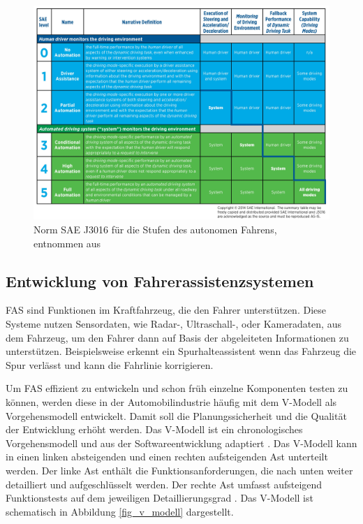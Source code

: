 \begin{figure}[h]
\centering
\includegraphics[scale=0.7]{images/level_autonomes_fahren.jpg}
\caption[Norm SAE J3016 für die Stufen des autonomen Fahrens]{Norm SAE J3016 für die Stufen des autonomen Fahrens, entnommen aus \cite{sae2014taxonomy}}
\label{fig_level_autonomes_fahren}
\end{figure}


\subsection{Entwicklung von Fahrerassistenzsystemen}
\label{grundlagen_fahren_entwicklung}

\ac{FAS} sind Funktionen im Kraftfahrzeug, die den Fahrer unterstützen. Diese Systeme nutzen Sensordaten, wie Radar-, Ultraschall-, oder Kameradaten, aus dem Fahrzeug, um den Fahrer dann auf Basis der abgeleiteten Informationen zu unterstützen. Beispielsweise erkennt ein Spurhalteassistent wenn das Fahrzeug die Spur verlässt und kann die Fahrlinie korrigieren. 

Um \ac{FAS} effizient zu entwickeln und schon früh einzelne Komponenten testen zu können, werden diese in der Automobilindustrie häufig mit dem V-Modell als Vorgehensmodell entwickelt. Damit soll die Planungssicherheit und die Qualität der Entwicklung erhöht werden. Das V-Modell ist ein chronologisches Vorgehensmodell und aus der Softwareentwicklung adaptiert \cite{vmodell2005}. Das V-Modell kann in einen linken absteigenden und einen rechten aufsteigenden Ast unterteilt werden. Der linke Ast enthält die Funktionsanforderungen, die nach unten weiter detailliert und aufgeschlüsselt werden. Der rechte Ast umfasst aufsteigend Funktionstests auf dem jeweiligen Detaillierungsgrad \cite{hakuli2015virtuelle}. Das V-Modell ist schematisch in Abbildung \ref{fig_v_modell} dargestellt.

